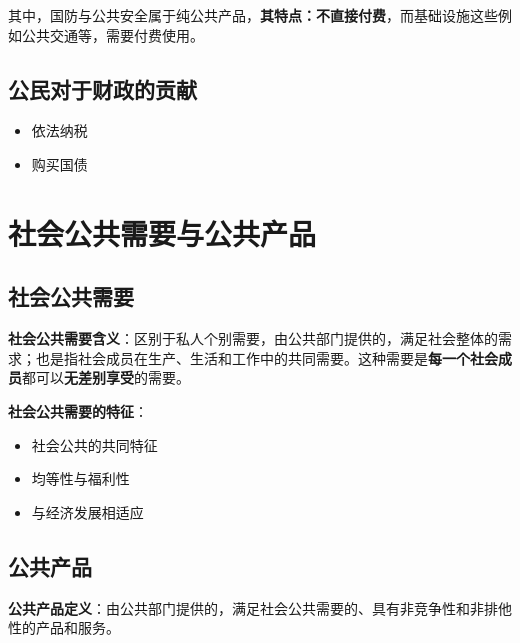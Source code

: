 \documentclass[
]{book}
\providecommand{\tightlist}{%
  \setlength{\itemsep}{0pt}\setlength{\parskip}{0pt}}
\theoremstyle{definition}
\theoremstyle{definition}
\theoremstyle{definition}
\theoremstyle{definition}
\theoremstyle{remark}
\begin{document}
其中，国防与公共安全属于纯公共产品，\textbf{其特点：不直接付费}，而基础设施这些例如公共交通等，需要付费使用。

\hypertarget{ux516cux6c11ux5bf9ux4e8eux8d22ux653fux7684ux8d21ux732e}{%
\subsection{公民对于财政的贡献}\label{ux516cux6c11ux5bf9ux4e8eux8d22ux653fux7684ux8d21ux732e}}

\begin{itemize}
\tightlist
\item
  依法纳税
\item
  购买国债
\end{itemize}

\hypertarget{ux793eux4f1aux516cux5171ux9700ux8981ux4e0eux516cux5171ux4ea7ux54c1}{%
\section{社会公共需要与公共产品}\label{ux793eux4f1aux516cux5171ux9700ux8981ux4e0eux516cux5171ux4ea7ux54c1}}

\hypertarget{ux793eux4f1aux516cux5171ux9700ux8981}{%
\subsection{社会公共需要}\label{ux793eux4f1aux516cux5171ux9700ux8981}}

\textbf{社会公共需要含义}：区别于私人个别需要，由公共部门提供的，满足社会整体的需求；也是指社会成员在生产、生活和工作中的共同需要。这种需要是\textbf{每一个社会成员}都可以\textbf{无差别享受}的需要。

\textbf{社会公共需要的特征}：

\begin{itemize}
\tightlist
\item
  社会公共的共同特征
\item
  均等性与福利性
\item
  与经济发展相适应
\end{itemize}

\hypertarget{ux516cux5171ux4ea7ux54c1}{%
\subsection{公共产品}\label{ux516cux5171ux4ea7ux54c1}}

\textbf{公共产品定义}：由公共部门提供的，满足社会公共需要的、具有非竞争性和非排他性的产品和服务。
\end{document}
